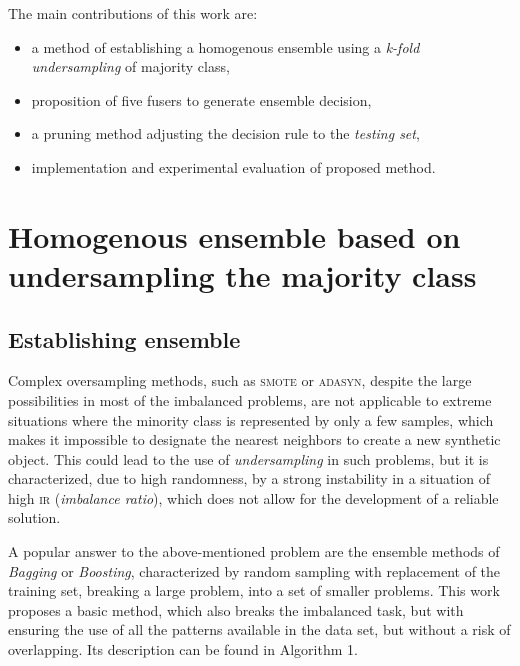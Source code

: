 \documentclass[pmlr]{jmlr}
\begin{document}
The main contributions of this work are:
\begin{itemize}
	\item a method of establishing a homogenous ensemble using a \emph{k-fold undersampling} of majority class,
	\item proposition of five fusers to generate ensemble decision,
	\item a pruning method adjusting the decision rule to the \emph{testing set},
	\item implementation and experimental evaluation of proposed method.
\end{itemize}

\section{Homogenous ensemble based on undersampling the majority class}
\label{sec:intro}
\subsection{Establishing ensemble}

Complex oversampling methods, such as \textsc{smote} or \textsc{adasyn}, despite the large possibilities in most of the imbalanced problems, are not applicable to extreme situations where the minority class is represented by only a few samples, which makes it impossible to designate the nearest neighbors to create a new synthetic object. This could lead to the use of \emph{undersampling} in such problems, but it is characterized, due to high randomness, by a strong instability in a situation of high \textsc{ir} (\emph{imbalance ratio}), which does not allow for the development of a reliable solution.

A popular answer to the above-mentioned problem are the ensemble methods of \emph{Bagging} or \emph{Boosting}, characterized by random sampling with replacement of the training set, breaking a large problem, into a set of smaller problems. This work proposes a basic method, which also breaks the imbalanced task, but with ensuring the use of all the patterns available in the data set, but without a risk of overlapping. Its description can be found in Algorithm 1.
\end{document}
